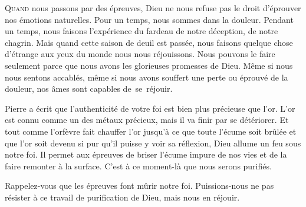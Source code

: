

\lettrine{Q}{uand} nous passons par des épreuves, Dieu ne nous refuse pas
 le droit d'éprouver nos émotions naturelles. Pour un temps, nous sommes
 dans la douleur. Pendant un temps, nous faisons l'expérience du fardeau
 de notre déception, de notre chagrin. Mais quand cette saison de deuil
 est passée, nous faisons quelque chose d'étrange aux yeux du monde\frcolon{}
 nous nous réjouissons.
 Nous pouvons le faire seulement parce que nous avons les glorieuses
 promesses de Dieu. Même si nous nous sentons accablés,
 même si nous avons souffert une perte ou éprouvé de la douleur,
 nos âmes sont capables de~se~réjouir.


Pierre a écrit que l'authenticité de votre foi est bien plus précieuse que l'or.
 L'or est connu comme un des métaux précieux, mais il va finir par se détériorer.
 Et tout comme l'orfèvre fait chauffer l'or jusqu'à ce que toute l'écume
 soit brûlée et que l'or soit devenu si pur qu'il puisse y voir sa réflexion,
 Dieu allume un feu sous notre foi. Il permet aux épreuves de briser l'écume
 impure de nos vies et de la faire remonter à la surface.
 C'est à ce moment-là que nous serons purifiés.

Rappelez-vous que les épreuves font mûrir notre foi.
 Puissions-nous ne pas résister à ce travail de purification de Dieu,
 mais nous en réjouir.

\dvrule







